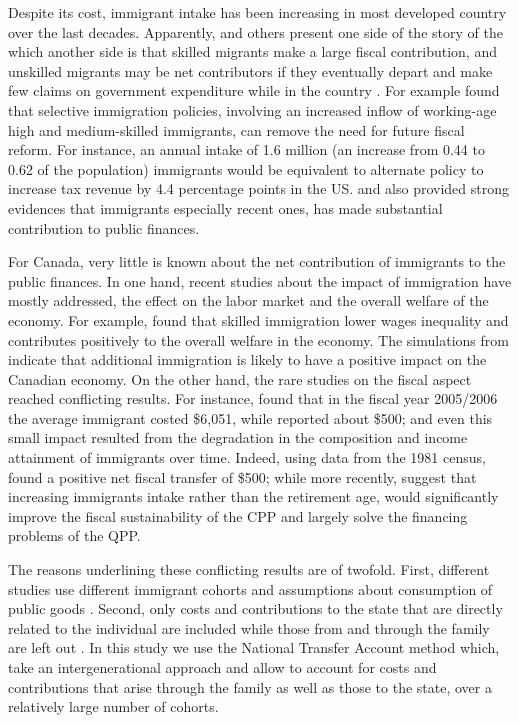   \vspace{0.7em}\par
  Despite its cost, immigrant intake has been increasing in most developed country over the last decades. Apparently, \citet{Borjas:2014hr} and others present one side of the story of the which another side is that skilled migrants make a large fiscal contribution, and unskilled migrants may be net contributors if they eventually depart and make few claims on government expenditure while in the country \citep{Rowthorn:2008kk}. For example \citet{Storesletten:2000cn} found that selective immigration policies, involving an increased inflow of working-age high and medium-skilled immigrants, can remove the need for future fiscal reform. For instance, an annual intake of 1.6 million (an increase from 0.44 to 0.62 of the population) immigrants would be equivalent to alternate policy to increase tax revenue by 4.4 percentage points in the US. \citet{Akin:2012gh} and \citet{Dustmann:2014dr} also provided strong evidences that immigrants especially recent ones, has made substantial contribution to public finances.


  \vspace{0.7em}\par
  For Canada, very little is known about the net contribution of immigrants to the public finances. In one hand, recent studies about the impact of immigration have mostly addressed, the effect on the labor market and the overall welfare of the economy. For example, \citet{Ileri:2019hf} found that skilled immigration lower wages inequality and contributes positively to the overall welfare in the economy. The simulations from \citet{Dungan:2013jp} indicate that additional immigration is likely to have a positive impact on the Canadian economy. On the other hand, the rare studies on the fiscal aspect reached conflicting results. For instance, \citet{Grubel:2012wo} found that in the fiscal year 2005/2006 the average immigrant costed \$6,051,  while \citet{Javdani:2013gu} reported about \$500; and even this small impact resulted from the degradation in the composition and income attainment of immigrants over time. Indeed, using data from the 1981 census, \citet{Akbari:1989fh} found a positive net fiscal transfer of \$500; while more recently, \citet{Hering:2010tz} suggest that increasing immigrants intake rather than the retirement age, would significantly improve the fiscal sustainability of the CPP and largely solve the financing problems of the QPP.

  \vspace{0.7em}\par
  The reasons underlining these conflicting results are of twofold. First, different studies use different immigrant cohorts and assumptions about consumption of public goods \citep{Grubel:2012wo}. Second, only costs and contributions to the state that are directly related to the individual are included while those from and through the family are left out \citep{dAlbis:2019de}. In this study we use the National Transfer Account method which, take an intergenerational approach and allow to account for costs and contributions that arise through the family as well as those to the state, over a relatively large number of cohorts.

